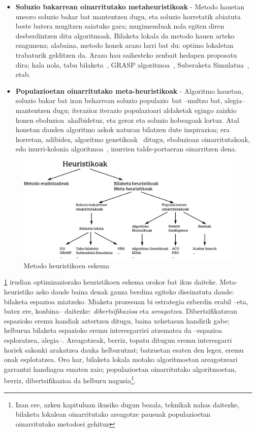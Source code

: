 \documentclass[eu]{ifirak}\usepackage[]{graphicx}\usepackage[]{color}
\newcommand{\zkk}{\guillemotleft}
\newcommand{\skk}{\guillemotright}
\begin{document}
\begin{itemize}
\item \textbf{Soluzio bakarrean oinarritutako metaheuristikoak} - Metodo hauetan uneoro soluzio bakar bat mantentzen dugu, eta soluzio horretatik abiatuta beste batera mugitzen saiatuko gara; mugimenduak nola egiten diren desberdintzen ditu algoritmoak. Bilaketa lokala da metodo hauen arteko ezagunena; alabaina, metodo honek arazo larri bat du: optimo lokaletan trabaturik gelditzen da. Arazo hau saihesteko zenbait hedapen proposatu dira; hala nola, tabu bilaketa~\cite{glover1986}, GRASP algoritmoa~\cite{feo1989}, Suberaketa Simulatua~\cite{kirkpatrick1983,cerny1985}, etab.
\item \textbf{Populazioetan oinarritutako meta-heuristikoak} - Algoritmo hauetan, soluzio bakar bat izan beharrean soluzio \zkk populazio\skk\ bat --multzo bat, alegia-- mantentzen dugu; iterazioz iterazio populazioari aldaketak egingo zaizkio honen \zkk eboluzioa\skk\ ahalbidetuz, eta geroz eta soluzio hobeagoak lortuz. Atal honetan dauden algoritmo askok naturan bilatzen dute inspirazioa; era horretan, adibidez, algoritmo genetikoak~\cite{holland1975} ditugu, eboluzioan oinarritutakoak, edo inurri-kolonia algoritmoa~\cite{dorigo1992}, inurrien talde-portaeran oinarritzen dena.
\end{itemize}

\begin{figure}[t]
\centering
\includegraphics[width=1\linewidth]{./Irudiak/heur_sailkap}
\caption{Metodo heuristikoen eskema}
\label{fig:heur_sailkap}
\end{figure}

\ref{fig:heur_sailkap} irudian optimizaziorako heuristikoen eskema orokor bat ikus daiteke. Meta-heuristiko asko daude baina denak gauza berdina egiteko diseinatuta daude: bilaketa espazioa miatzeko. Miaketa prozesuan bi estrategia ezberdin erabil --eta, batez ere, konbina-- daitezke: \textit{dibertsifikazioa} eta \textit{areagotzea}. Dibertsifikatzean espazioko eremu handiak aztertzen ditugu, baina xehetasun handirik gabe; helburua bilaketa espazioko eremu interesgarriei atzematea da --espazioa esploratzea, alegia--. Areagotzeak, berriz, topatu ditugun eremu interesgarri horiek sakonki arakatzea dauka helburutzat; batzuetan esaten den legez, eremu onak esplotatzea. Oro har, bilaketa lokala motako algoritmoetan areagotzeari garrantzi handiagoa ematen zaio; populazioetan oinarritutako algoritmoetan, berriz, dibertsifikazioa da helburu nagusia\footnote{Izan ere, azken kapituluan ikusiko dugun bezala, teknikak nahas daitezke, bilaketa lokalean oinarritutako areagotze pausuak populazioetan oinarritutako metodoei gehituz}.
\end{document}
